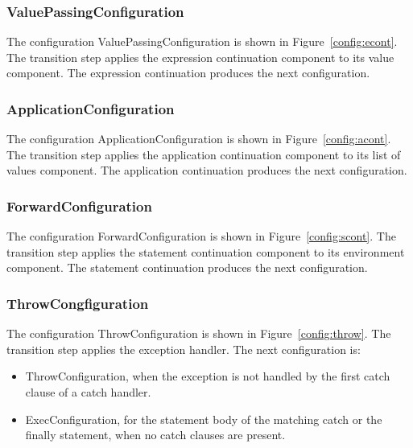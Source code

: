 \documentclass[a4paper,oneside]{article}
\begin{document}
\subsubsection{ValuePassingConfiguration}
\label{suubsubsec:valuepassingconfig}

The configuration ValuePassingConfiguration is shown in Figure~\ref{config:econt}.
The transition step applies the expression continuation component to its value component.
The expression continuation produces the next configuration.


\subsubsection{ApplicationConfiguration}
\label{subsubsec:applicationconfig}

The configuration ApplicationConfiguration is shown in Figure~\ref{config:acont}.
The transition step applies the application continuation component to its list of values component.
The application continuation produces the next configuration.


\subsubsection{ForwardConfiguration}
\label{subsubsec:forwardconfig}

The configuration ForwardConfiguration is shown in Figure~\ref{config:scont}.
The transition step applies the statement continuation component to its environment component.
The statement continuation produces the next configuration.


\subsubsection{ThrowCongfiguration}
\label{subsubsec:throwconfig}

The configuration ThrowConfiguration is shown in Figure~\ref{config:throw}.
The transition step applies the exception handler.
The next configuration is:

\begin{itemize}
    \item ThrowConfiguration, when the exception is not handled by the first catch clause of a catch handler.
    \item ExecConfiguration, for the statement body of the matching catch or the finally statement, when no catch clauses are present.
\end{itemize}
\end{document}
